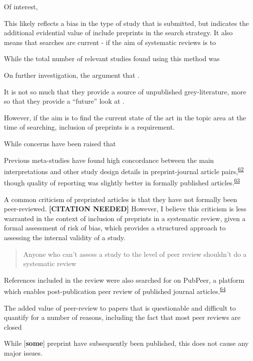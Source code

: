 \documentclass[a4paper, twoside]{templates/ociamthesis}
\begin{document}
Of interest,

This likely reflects a bias in the type of study that is submitted, but indicates the additional evidential value of include preprints in the search strategy. It also means that searches are current - if the aim of systematic reviews is to

While the total number of relevant studies found using this method was

On further investigation, the argument that .

It is not so much that they provide a source of unpublished grey-literature, more so that they provide a ``future'' look at .

However, if the aim is to find the current state of the art in the topic area at the time of searching, inclusion of preprints is a requirement.

While concerns have been raised that

Previous meta-studies have found high concordance between the main interpretations and other study design details in preprint-journal article pairs,\textsuperscript{\protect\hyperlink{ref-shi2021}{62}} though quality of reporting was slightly better in formally published articles.\textsuperscript{\protect\hyperlink{ref-carneiro2020}{63}}

A common criticism of preprinted articles is that they have not formally been peer-reviewed. \textbf{{[}CITATION NEEDED{]}} However, I believe this criticism is less warranted in the context of inclusion of preprints in a systematic review, given a formal assessment of risk of bias, which provides a structured approach to assessing the internal validity of a study.

\begin{quote}
Anyone who can't assess a study to the level of peer review shouldn't do a systematic review
\end{quote}

References included in the review were also searched for on PubPeer, a platform which enables post-publication peer review of published journal articles.\textsuperscript{\protect\hyperlink{ref-hunter2012}{64}}

The added value of peer-review to papers that is questionable and difficult to quantify for a number of reasons, including the fact that most peer reviews are closed

While {[}\textbf{some}{]} preprint have subsequently been published, this does not cause any major issues.
\end{document}
